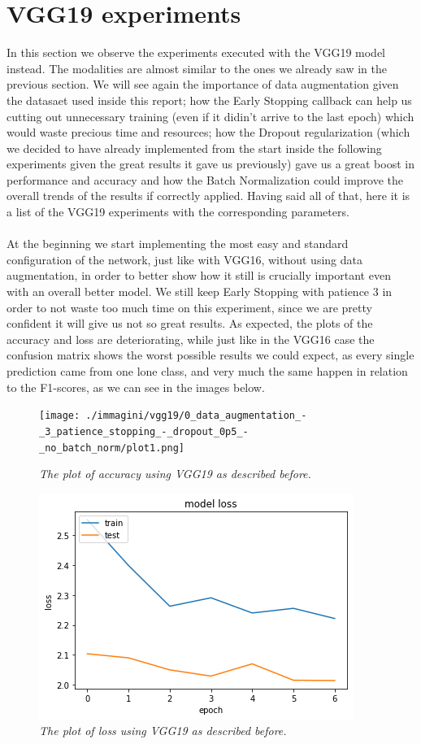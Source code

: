 \documentclass[12pt,a4paper]{report}
\begin{document}
\section{VGG19 experiments}
In this section we observe the experiments executed with the VGG19 model instead. The modalities are almost similar to the ones we already saw in the previous section. We will see again the importance of data augmentation given the datasaet used inside this report; how the Early Stopping callback can help us cutting out unnecessary training (even if it didin't arrive to the last epoch) which would waste precious time and resources; how the Dropout regularization (which we decided to have already implemented from the start inside the following experiments given the great results it gave us previously) gave us a great boost in performance and accuracy and how the Batch Normalization could improve the overall trends of the results if correctly applied. Having said all of that, here it is a list of the VGG19 experiments with the corresponding parameters. \\ \\
At the beginning we start implementing the most easy and standard configuration of the network, just like with VGG16, without using data augmentation, in order to better show how it still is crucially important even with an overall better model. We still keep Early Stopping with patience 3 in order to not waste too much time on this experiment, since we are pretty confident it will give us not so great results. As expected, the plots of the accuracy and loss are deteriorating, while just like in the VGG16 case the confusion matrix shows the worst possible results we could expect, as every single prediction came from one lone class, and very much the same happen in relation to the F1-scores, as we can see in the images below.
\begin{figure}[H]
\centering
\texttt{[image: ./immagini/vgg19/0\_data\_augmentation\_-\_3\_patience\_stopping\_-\_dropout\_0p5\_-\_no\_batch\_norm/plot1.png]}
\caption{\textit{The plot of accuracy using VGG19 as described before.}}
\end{figure}
\begin{figure}[H]
\centering
\includegraphics[scale=0.45]{./immagini/vgg19/0_data_augmentation_-_3_patience_stopping_-_dropout_0p5_-_no_batch_norm/plot2.png}
\caption{\textit{The plot of loss using VGG19 as described before.}}
\end{figure}
\end{document}
